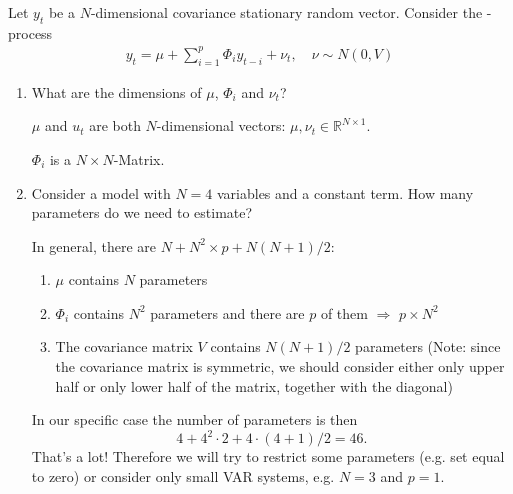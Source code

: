 Let $y_t$ be a $N$-dimensional covariance stationary random vector. Consider the \varp[p]{}-process
\begin{align*}
    y_t = \mu + \sum_{i=1}^p \Phi_i y_{t-i} + \nu_t, \quad \nu \sim N(0, V)
\end{align*}

\begin{enumerate}
    \item What are the dimensions of $\mu$, $\Phi_i$ and $\nu_t$?

          \begin{sol}
              $\mu$ and $u_t$ are both $N$-dimensional vectors: $\mu, \nu_t \in \mathbb{R}^{N \times 1}$.

              $\Phi_i$ is a $N \times N$-Matrix.
          \end{sol}

    \item Consider a \varp[2]{} model with $N=4$ variables and a constant term. How many parameters do we need to estimate?

          \begin{sol}
              In general, there are $N + N^2 \times p + N (N + 1) / 2$:
              \begin{enumerate}[label=-]
                  \item $\mu$ contains $N$ parameters

                  \item $\Phi_i$ contains $N^2$ parameters and there are $p$ of them $\Rightarrow$ $p \times N^2$

                  \item The covariance matrix $V$ contains $N (N + 1) / 2$ parameters (Note: since the covariance matrix is symmetric, we should consider either only upper half or only lower half of the matrix, together with the diagonal)
              \end{enumerate}

              In our specific case the number of parameters is then
              \[ 4 + 4^2 \cdot 2 + 4 \cdot (4 + 1) / 2 = 46. \]
              That's a lot! Therefore we will try to restrict some parameters (e.g. set equal to zero) or consider only small VAR systems, e.g. $N=3$ and $p=1$.
          \end{sol}
\end{enumerate}
